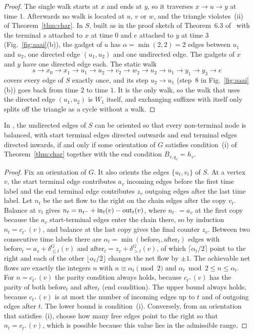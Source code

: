 \begin{proof}
The single walk starts at $x$ and ends at $y$, so it traverses $x\to u\to y$ at time $1$. Afterwards no walk is located at $u$, $v$ or $w$, and the triangle violates~(ii) of Theorem~\ref{thm:char}. In $S$, built as in the proof sketch of Theorem~6.3 of~\cite{deligkas2025} with the terminal $s$ attached to $x$ at time $0$ and $e$ attached to $y$ at time $3$ (Fig.~\ref{fig:aaai}(b)), the gadget of $u$ has $\alpha=\min(2,2)=2$ edges between $u_1$ and $u_2$, one directed edge $(u_1,u_2)$ and one undirected edge. The gadgets of $x$ and $y$ have one directed edge each. The static walk
\[
  s\to x_0\to x_1\to u_1\to u_2\to v_2\to w_2\to u_2\to u_1\to y_1\to y_3\to e
\]
covers every edge of $S$ exactly once, and its step $u_2\to u_1$ (step~8 in Fig.~\ref{fig:aaai}(b)) goes back from time $2$ to time $1$. It is the only walk, so the walk that uses the directed edge $(u_1,u_2)$ is $W_1$ itself, and exchanging suffixes with itself only splits off the triangle as a cycle without a walk.
\end{proof}

\begin{lemma}\label{lem:aaai}
In \FIX{}, the undirected edges of $S$ can be oriented so that every non-terminal node is balanced, with start terminal edges directed outwards and end terminal edges directed inwards, if and only if some orientation of $G$ satisfies condition~(i) of Theorem~\ref{thm:char} together with the end condition $B_{v,q_v}=h_v$.
\end{lemma}

\begin{proof}
Fix an orientation of $G$. It also orients the edges $\{u_t,v_t\}$ of $S$. At a vertex $v$, the start terminal edge contributes $a_v$ incoming edges before the first time label and the end terminal edge contributes $z_v$ outgoing edges after the last time label. Let $n_t$ be the net flow to the right on the chain edges after the copy $v_t$. Balance at $v_t$ gives $n_t=n_{t^-}+\mathrm{in}_t(v)-\mathrm{out}_t(v)$, where $n_{t^-}=a_v$ at the first copy because the $a_v$ start-terminal edges enter the chain there, so by induction $n_t=c_{t^+}(v)$, and balance at the last copy gives the final counter $z_v$. Between two consecutive time labels there are $\alpha_t=\min(\mathrm{before}_t,\mathrm{after}_t)$ edges with $\mathrm{before}_t=a_v+\delta^G_{\le t}(v)$ and $\mathrm{after}_t=z_v+\delta^G_{>t}(v)$, of which $\lceil\alpha_t/2\rceil$ point to the right and each of the other $\lfloor\alpha_t/2\rfloor$ changes the net flow by $\pm1$. The achievable net flows are exactly the integers $n$ with $n\equiv\alpha_t\pmod 2$ and $\alpha_t\bmod 2\le n\le\alpha_t$. For $n=c_{t^+}(v)$ the parity condition always holds, because $c_{t^+}(v)$ has the parity of both $\mathrm{before}_t$ and $\mathrm{after}_t$ (end condition). The upper bound always holds, because $c_{t^+}(v)$ is at most the number of incoming edges up to $t$ and of outgoing edges after $t$. The lower bound is condition~(i). Conversely, from an orientation that satisfies~(i), choose how many free edges point to the right so that $n_t=c_{t^+}(v)$, which is possible because this value lies in the admissible range.
\end{proof}

